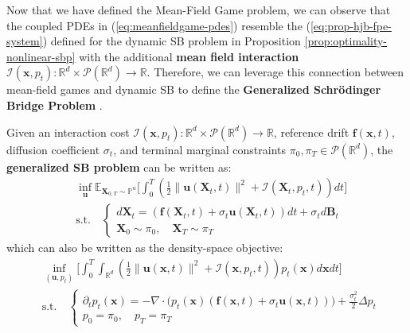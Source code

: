 \documentclass{article}
\newcommand{\boldtext}[1]{\textbf{\textcolor{MyGreen}{#1}}}
\begin{document}
Now that we have defined the Mean-Field Game problem, we can observe that the coupled PDEs in (\ref{eq:meanfieldgame-pdes}) resemble the (\ref{eq:prop-hjb-fpe-system}) defined for the dynamic SB problem in Proposition \ref{prop:optimality-nonlinear-sbp} with the additional \boldtext{mean field interaction} $\mathcal{I}(\boldsymbol{x},p_t):\mathbb{R}^d\times\mathcal{P}(\mathbb{R}^d)\to \mathbb{R}$. Therefore, we can leverage this connection between mean-field games and dynamic SB to define the \boldtext{Generalized Schrödinger Bridge Problem} \citep{chen2015optimal, chen2023density,liu2022deep, liu2023generalized}.

\begin{definition}\label{def:generalized-sbp}
    Given an interaction cost $\mathcal{I}(\boldsymbol{x},p_t):\mathbb{R}^d\times\mathcal{P}(\mathbb{R}^d)\to \mathbb{R}$, reference drift $\boldsymbol{f}(\boldsymbol{x},t)$, diffusion coefficient $\sigma_t$, and terminal marginal constraints $\pi_0, \pi_T\in \mathcal{P}(\mathbb{R}^d)$, the \textbf{generalized SB problem} can be written as:
    \begin{align}
        &\inf_{\boldsymbol{u}}\mathbb{E}_{\boldsymbol{X}_{0,T}\sim \mathbb{P}^u}\bigg[\int_0^T\left(\frac{1}{2}\|\boldsymbol{u}(\boldsymbol{X}_t,t)\|^2+\mathcal{I}(\boldsymbol{X}_t,p_t,t)\right)dt\bigg]\tag{Generalized SB Problem}\label{eq:generalized-sbp}\\
        &\text{s.t.}\quad\begin{cases}
            d\boldsymbol{X}_t=(\boldsymbol{f}(\boldsymbol{X}_t,t)+\sigma_t\boldsymbol{u}(\boldsymbol{X}_t,t))dt+\sigma_td\boldsymbol{B}_t\\
            \boldsymbol{X}_0\sim \pi_0, \quad \boldsymbol{X}_T\sim\pi_T
        \end{cases}
    \end{align}
    which can also be written as the density-space objective:
    \begin{align}
        &\inf_{(\boldsymbol{u}, p_t)}\bigg[\int_0^T\int_{\mathbb{R}^d}\left(\frac{1}{2}\|\boldsymbol{u}(\boldsymbol{x},t)\|^2+\mathcal{I}(\boldsymbol{x},p_t,t)\right)p_t(\boldsymbol{x})d\boldsymbol{x}dt\bigg]\\
        &\text{s.t.}\quad\begin{cases}
            \partial_tp_t(\boldsymbol{x}) = -\nabla\cdot\big(p_t(\boldsymbol{x})(\boldsymbol{f}(\boldsymbol{x},t)+\sigma_t\boldsymbol{u}(\boldsymbol{x},t))\big)+\frac{\sigma_t^2}{2} \Delta p_t\\
            p_0=\pi_0, \quad p_T=\pi_T
        \end{cases}
    \end{align}
\end{definition}
\end{document}
